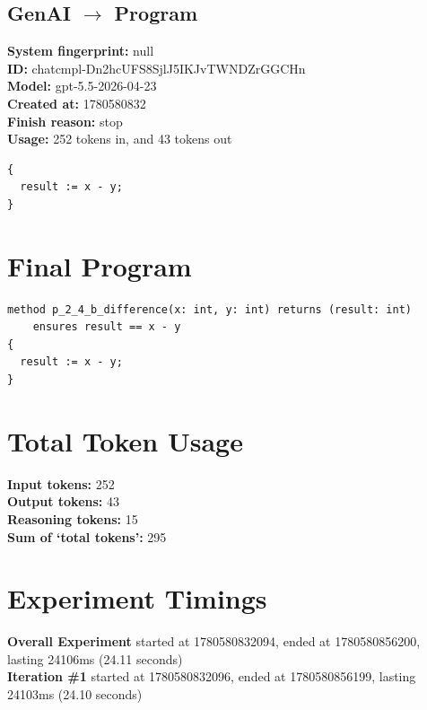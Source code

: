 \documentclass{article}
\begin{document}
\subsection*{GenAI $\rightarrow$ Program}
\textbf{System fingerprint: }null
\\\textbf{ID: }chatcmpl-Dn2hcUFS8SjlJ5IKJvTWNDZrGGCHn
\\\textbf{Model: }gpt-5.5-2026-04-23
\\\textbf{Created at: }1780580832
\\\textbf{Finish reason: }stop
\\\textbf{Usage: }252 tokens in, and 43 tokens out
\begin{lstlisting}
{
  result := x - y;
}
\end{lstlisting}
\section*{Final Program}
\begin{lstlisting}
method p_2_4_b_difference(x: int, y: int) returns (result: int)
	ensures result == x - y
{
  result := x - y;
}
\end{lstlisting}
\section*{Total Token Usage}
\textbf{Input tokens: }252
\\\textbf{Output tokens: }43
\\\textbf{Reasoning tokens: }15
\\\textbf{Sum of `total tokens': }295
\section*{Experiment Timings}
\textbf{Overall Experiment} started at 1780580832094, ended at 1780580856200, lasting 24106ms (24.11 seconds)
\\\textbf{Iteration \#1} started at 1780580832096, ended at 1780580856199, lasting 24103ms (24.10 seconds)
\end{document}
